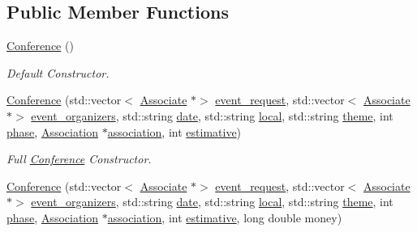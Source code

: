 \subsection*{Public Member Functions}
\begin{DoxyCompactItemize}
\item 
\mbox{\hyperlink{classConference_a433a85d640693398c2c96a2a655fc6f4}{Conference}} ()
\begin{DoxyCompactList}\small\item\em Default Constructor. \end{DoxyCompactList}\item 
\mbox{\hyperlink{classConference_a128ae6e184a018975429e6dda331c865}{Conference}} (std\+::vector$<$ \mbox{\hyperlink{classAssociate}{Associate}} $\ast$$>$ \mbox{\hyperlink{classEvent_a6cec387dca85f0a0e8419cfc94eb320e}{event\+\_\+request}}, std\+::vector$<$ \mbox{\hyperlink{classAssociate}{Associate}} $\ast$$>$ \mbox{\hyperlink{classEvent_ad35e04c759fdbfad75aed0b6e2eef63c}{event\+\_\+organizers}}, std\+::string \mbox{\hyperlink{classEvent_a9a93c9d38211f84cd6e347690e177f11}{date}}, std\+::string \mbox{\hyperlink{classEvent_a3d1f28a3bde9ab718d5b0003f8ab5129}{local}}, std\+::string \mbox{\hyperlink{classEvent_aa9cc4378d5cecaadc8e6de92b313e6f8}{theme}}, int \mbox{\hyperlink{classEvent_a4059db56458a92ddb5bd1d1443631b02}{phase}}, \mbox{\hyperlink{classAssociation}{Association}} $\ast$\mbox{\hyperlink{classEvent_a3c8694833e50dbd2e37943eff1f5c9b1}{association}}, int \mbox{\hyperlink{classConference_ab3acc9b9aec3a4dbcfd18d1611337ecb}{estimative}})
\begin{DoxyCompactList}\small\item\em Full \mbox{\hyperlink{classConference}{Conference}} Constructor. \end{DoxyCompactList}\item 
\mbox{\hyperlink{classConference_a576bd503bb7570120658b970223611c3}{Conference}} (std\+::vector$<$ \mbox{\hyperlink{classAssociate}{Associate}} $\ast$$>$ \mbox{\hyperlink{classEvent_a6cec387dca85f0a0e8419cfc94eb320e}{event\+\_\+request}}, std\+::vector$<$ \mbox{\hyperlink{classAssociate}{Associate}} $\ast$$>$ \mbox{\hyperlink{classEvent_ad35e04c759fdbfad75aed0b6e2eef63c}{event\+\_\+organizers}}, std\+::string \mbox{\hyperlink{classEvent_a9a93c9d38211f84cd6e347690e177f11}{date}}, std\+::string \mbox{\hyperlink{classEvent_a3d1f28a3bde9ab718d5b0003f8ab5129}{local}}, std\+::string \mbox{\hyperlink{classEvent_aa9cc4378d5cecaadc8e6de92b313e6f8}{theme}}, int \mbox{\hyperlink{classEvent_a4059db56458a92ddb5bd1d1443631b02}{phase}}, \mbox{\hyperlink{classAssociation}{Association}} $\ast$\mbox{\hyperlink{classEvent_a3c8694833e50dbd2e37943eff1f5c9b1}{association}}, int \mbox{\hyperlink{classConference_ab3acc9b9aec3a4dbcfd18d1611337ecb}{estimative}}, long double money)

\end{DoxyCompactItemize}
